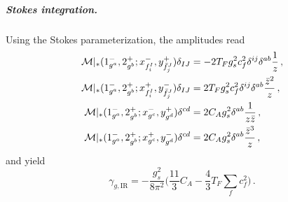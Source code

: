 \subparagraph{Stokes integration.}
Using the Stokes parameterization, the amplitudes read
\begin{align}
    \mathcal M|_*(1^-_{g^a},2^+_{g^b};x_{f_i^I}^{-},y_{\bar f_j^J}^{+})\delta_{IJ} &= -2T_Fg_s^2c_f^2\delta^{ij}\delta^{ab}\frac{1}{z}\,, \\
    \mathcal M|_*(1^-_{g^a},2^+_{g^b};x_{f_i^I}^{+},y_{\bar f_j^J}^{-})\delta_{IJ} &= 2T_Fg_s^2c_f^2\delta^{ij}\delta^{ab}\frac{\bar{z}^2}{z}\,,\\
    \mathcal M|_* (1^-_{g^a},2^+_{g^b};x_{g^c}^{-},y_{g^d}^{+}) \delta^{cd} &= 2C_A g_s^2\delta^{ab}\frac{1}{z \bar{z}}\,, \\
    \mathcal M|_* (1^-_{g^a},2^+_{g^b};x_{g^c}^{+},y_{g^d}^{-}) \delta^{cd} &=2C_A g_s^2\delta^{ab}\frac{ \bar{z}^3}{z }\,,
\end{align}
and yield
\begin{equation}\label{eq:gammaIRgluon_stokes}
    \gamma_{g,\text{IR}} =-\frac{g_s^2}{8\pi^2}\bigg(\frac{11}{3}C_A -\frac{4}{3}T_F\sum_fc_f^2\bigg) \,.
\end{equation}



